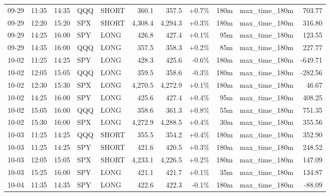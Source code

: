 \documentclass[11pt,a4paper,twoside]{article}
\begin{document}
\begin{center}
\begin{longtable}{>{\color{txtmain}}l l l l l r r r r >{\color{txtmain}}l r}
09-29 & 11:35 & 14:35 & QQQ & SHORT & 360.1 & 357.5 & \textcolor{wingreen}{+0.7\%} & 180m & max\_time\_180m & \textcolor{wingreen}{703.77} \\
09-29 & 12:20 & 15:20 & SPX & SHORT & 4,308.4 & 4,294.3 & \textcolor{wingreen}{+0.3\%} & 180m & max\_time\_180m & \textcolor{wingreen}{316.80} \\
09-29 & 14:25 & 16:00 & SPY & LONG & 426.8 & 427.4 & \textcolor{wingreen}{+0.1\%} & 95m & max\_time\_180m & \textcolor{wingreen}{123.55} \\
09-29 & 14:35 & 16:00 & QQQ & LONG & 357.5 & 358.3 & \textcolor{wingreen}{+0.2\%} & 85m & max\_time\_180m & \textcolor{wingreen}{227.77} \\
10-02 & 11:25 & 14:25 & SPY & LONG & 428.3 & 425.6 & \textcolor{lossred}{-0.6\%} & 180m & max\_time\_180m & \textcolor{lossred}{-649.71} \\
10-02 & 12:05 & 15:05 & QQQ & LONG & 359.5 & 358.6 & \textcolor{lossred}{-0.3\%} & 180m & max\_time\_180m & \textcolor{lossred}{-282.56} \\
10-02 & 12:30 & 15:30 & SPX & LONG & 4,270.5 & 4,272.9 & \textcolor{wingreen}{+0.1\%} & 180m & max\_time\_180m & \textcolor{wingreen}{46.67} \\
10-02 & 14:25 & 16:00 & SPY & LONG & 425.6 & 427.4 & \textcolor{wingreen}{+0.4\%} & 95m & max\_time\_180m & \textcolor{wingreen}{408.25} \\
10-02 & 15:05 & 16:00 & QQQ & LONG & 358.6 & 361.3 & \textcolor{wingreen}{+0.8\%} & 55m & max\_time\_180m & \textcolor{wingreen}{751.35} \\
10-02 & 15:30 & 16:00 & SPX & LONG & 4,272.9 & 4,288.5 & \textcolor{wingreen}{+0.4\%} & 30m & max\_time\_180m & \textcolor{wingreen}{355.56} \\
10-03 & 11:25 & 14:25 & QQQ & SHORT & 355.5 & 354.2 & \textcolor{wingreen}{+0.4\%} & 180m & max\_time\_180m & \textcolor{wingreen}{352.90} \\
10-03 & 11:25 & 14:25 & SPY & SHORT & 421.6 & 420.5 & \textcolor{wingreen}{+0.3\%} & 180m & max\_time\_180m & \textcolor{wingreen}{248.52} \\
10-03 & 12:05 & 15:05 & SPX & SHORT & 4,233.1 & 4,226.5 & \textcolor{wingreen}{+0.2\%} & 180m & max\_time\_180m & \textcolor{wingreen}{147.09} \\
10-03 & 15:25 & 16:00 & SPY & LONG & 421.1 & 421.7 & \textcolor{wingreen}{+0.1\%} & 35m & max\_time\_180m & \textcolor{wingreen}{134.87} \\
10-04 & 11:35 & 14:35 & SPY & LONG & 422.6 & 422.3 & \textcolor{lossred}{-0.1\%} & 180m & max\_time\_180m & \textcolor{lossred}{-88.09} \\

\end{longtable}
\end{center}
\end{document}
